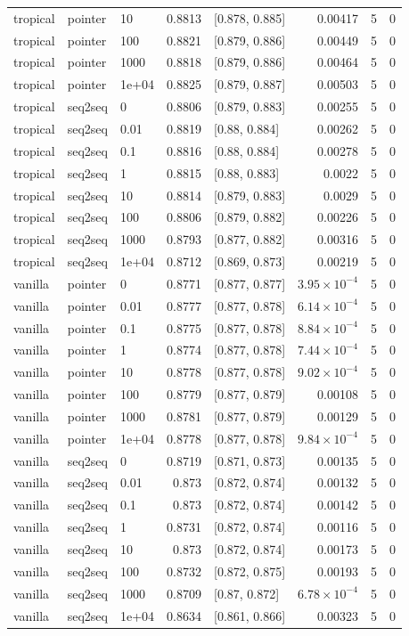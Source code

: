 \documentclass[10pt]{article}
\begin{document}
{\begin{longtable}{lllrlrrr}
tropical & pointer & 10 & 0.8813 & [0.878, 0.885] & 0.00417 & 5 & 0\\
tropical & pointer & 100 & 0.8821 & [0.879, 0.886] & 0.00449 & 5 & 0\\
tropical & pointer & 1000 & 0.8818 & [0.879, 0.886] & 0.00464 & 5 & 0\\
tropical & pointer & 1e+04 & 0.8825 & [0.879, 0.887] & 0.00503 & 5 & 0\\
tropical & seq2seq & 0 & 0.8806 & [0.879, 0.883] & 0.00255 & 5 & 0\\
tropical & seq2seq & 0.01 & 0.8819 & [0.88, 0.884] & 0.00262 & 5 & 0\\
tropical & seq2seq & 0.1 & 0.8816 & [0.88, 0.884] & 0.00278 & 5 & 0\\
tropical & seq2seq & 1 & 0.8815 & [0.88, 0.883] & 0.0022 & 5 & 0\\
tropical & seq2seq & 10 & 0.8814 & [0.879, 0.883] & 0.0029 & 5 & 0\\
tropical & seq2seq & 100 & 0.8806 & [0.879, 0.882] & 0.00226 & 5 & 0\\
tropical & seq2seq & 1000 & 0.8793 & [0.877, 0.882] & 0.00316 & 5 & 0\\
tropical & seq2seq & 1e+04 & 0.8712 & [0.869, 0.873] & 0.00219 & 5 & 0\\
vanilla & pointer & 0 & 0.8771 & [0.877, 0.877] & $3.95\times10^{-4}$ & 5 & 0\\
vanilla & pointer & 0.01 & 0.8777 & [0.877, 0.878] & $6.14\times10^{-4}$ & 5 & 0\\
vanilla & pointer & 0.1 & 0.8775 & [0.877, 0.878] & $8.84\times10^{-4}$ & 5 & 0\\
vanilla & pointer & 1 & 0.8774 & [0.877, 0.878] & $7.44\times10^{-4}$ & 5 & 0\\
vanilla & pointer & 10 & 0.8778 & [0.877, 0.878] & $9.02\times10^{-4}$ & 5 & 0\\
vanilla & pointer & 100 & 0.8779 & [0.877, 0.879] & 0.00108 & 5 & 0\\
vanilla & pointer & 1000 & 0.8781 & [0.877, 0.879] & 0.00129 & 5 & 0\\
vanilla & pointer & 1e+04 & 0.8778 & [0.877, 0.878] & $9.84\times10^{-4}$ & 5 & 0\\
vanilla & seq2seq & 0 & 0.8719 & [0.871, 0.873] & 0.00135 & 5 & 0\\
vanilla & seq2seq & 0.01 & 0.873 & [0.872, 0.874] & 0.00132 & 5 & 0\\
vanilla & seq2seq & 0.1 & 0.873 & [0.872, 0.874] & 0.00142 & 5 & 0\\
vanilla & seq2seq & 1 & 0.8731 & [0.872, 0.874] & 0.00116 & 5 & 0\\
vanilla & seq2seq & 10 & 0.873 & [0.872, 0.874] & 0.00173 & 5 & 0\\
vanilla & seq2seq & 100 & 0.8732 & [0.872, 0.875] & 0.00193 & 5 & 0\\
vanilla & seq2seq & 1000 & 0.8709 & [0.87, 0.872] & $6.78\times10^{-4}$ & 5 & 0\\
vanilla & seq2seq & 1e+04 & 0.8634 & [0.861, 0.866] & 0.00323 & 5 & 0\\
\bottomrule
\end{longtable}
}
\end{document}
